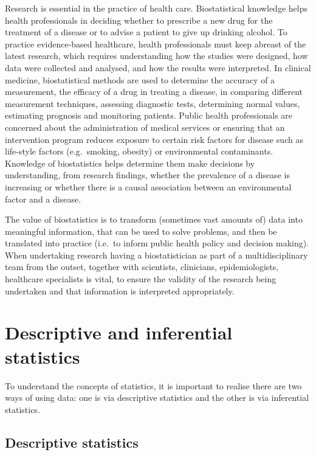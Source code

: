 \documentclass[
]{memoir}
\begin{document}
Research is essential in the practice of health care. Biostatistical knowledge helps health professionals in deciding whether to prescribe a new drug for the treatment of a disease or to advise a patient to give up drinking alcohol. To practice evidence-based healthcare, health professionals must keep abreast of the latest research, which requires understanding how the studies were designed, how data were collected and analysed, and how the results were interpreted. In clinical medicine, biostatistical methods are used to determine the accuracy of a measurement, the efficacy of a drug in treating a disease, in comparing different measurement techniques, assessing diagnostic tests, determining normal values, estimating prognosis and monitoring patients. Public health professionals are concerned about the administration of medical services or ensuring that an intervention program reduces exposure to certain risk factors for disease such as life-style factors (e.g.~smoking, obesity) or environmental contaminants. Knowledge of biostatistics helps determine them make decisions by understanding, from research findings, whether the prevalence of a disease is increasing or whether there is a causal association between an environmental factor and a disease.

The value of biostatistics is to transform (sometimes vast amounts of) data into meaningful information, that can be used to solve problems, and then be translated into practice (i.e.~to inform public health policy and decision making). When undertaking research having a biostatistician as part of a multidisciplinary team from the outset, together with scientists, clinicians, epidemiologists, healthcare specialists is vital, to ensure the validity of the research being undertaken and that information is interpreted appropriately.

\hypertarget{descriptive-and-inferential-statistics}{%
\section{Descriptive and inferential statistics}\label{descriptive-and-inferential-statistics}}

To understand the concepts of statistics, it is important to realise there are two ways of using data: one is via descriptive statistics and the other is via inferential statistics.

\hypertarget{descriptive-statistics}{%
\subsection{Descriptive statistics}\label{descriptive-statistics}}
\end{document}
